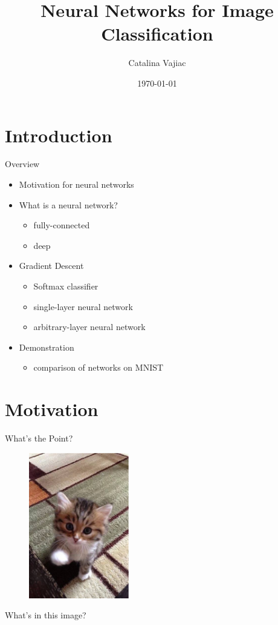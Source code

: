 \documentclass{beamer}
\title{Neural Networks for Image Classification}
\date{\today}
\author{Catalina Vajiac}
\institute{Saint Mary's College}
\begin{document}
  \maketitle

  \section{Introduction}
  \begin{frame}{Overview}
    \begin{itemize}
      \item Motivation for neural networks
      \item What is a neural network?
      \begin{itemize}
        \item fully-connected
        \item deep
      \end{itemize}
      \item Gradient Descent
      \begin{itemize}
        \item Softmax classifier
        \item single-layer neural network
        \item arbitrary-layer neural network
      \end{itemize}
      \item Demonstration
        \begin{itemize}
          \item comparison of networks on MNIST
        \end{itemize}
    \end{itemize}
  \end{frame}

  \section{Motivation}
  \begin{frame}{What's the Point?}
    \begin{figure}[ht!] \centering
      \includegraphics[height=2.5in]{../figures/kitty.eps}
    \end{figure}
    What's in this image?
  \end{frame}
\end{document}
